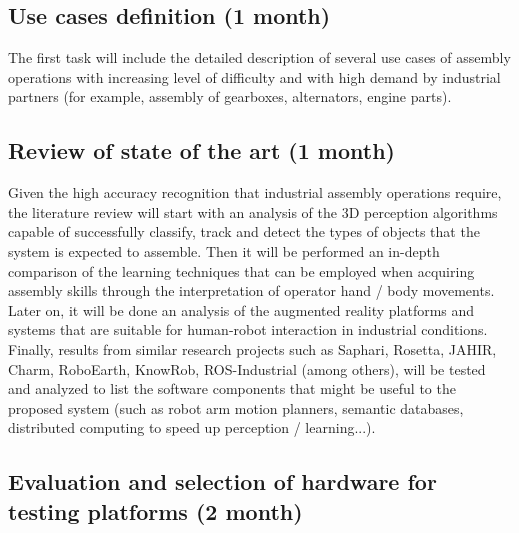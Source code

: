 


\subsection{Use cases definition (1 month)}

The first task will include the detailed description of several use cases of assembly operations with increasing level of difficulty and with high demand by industrial partners (for example, assembly of gearboxes, alternators, engine parts).


\subsection{Review of state of the art (1 month)}

Given the high accuracy recognition that industrial assembly operations require, the literature review will start with an analysis of the 3D perception algorithms capable of successfully classify, track and detect the types of objects that the system is expected to assemble. Then it will be performed an in-depth comparison of the learning techniques that can be employed when acquiring assembly skills through the interpretation of operator hand / body movements. Later on, it will be done an analysis of the augmented reality platforms and systems that are suitable for human-robot interaction in industrial conditions.
Finally, results from similar research projects such as Saphari, Rosetta, JAHIR, Charm, RoboEarth, KnowRob, ROS-Industrial (among others), will be tested and analyzed to list the software components that might be useful to the proposed system (such as robot arm motion planners, semantic databases, distributed computing to speed up perception / learning...).


\subsection{Evaluation and selection of hardware for testing platforms (2 month)}

